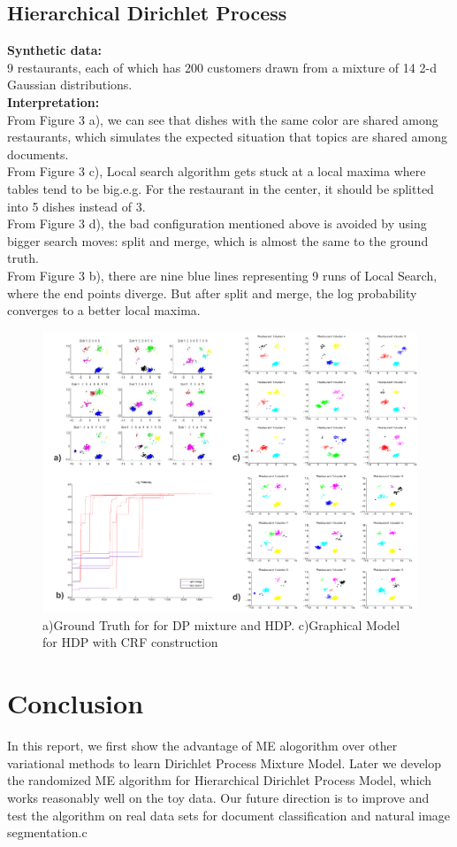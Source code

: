 \documentclass{article}
\begin{document}
\subsection{Hierarchical Dirichlet Process}
{\bf Synthetic data:}\\
 9 restaurants, each of which has 200 customers drawn from a mixture of 14 2-d Gaussian distributions.\\
{\bf Interpretation:}\\
From Figure 3 a), we can see that dishes with the same color are shared among restaurants, which simulates the expected situation that topics are shared among documents.\\
From Figure 3 c), Local search algorithm gets stuck at a local maxima where tables tend to be big.e.g. For the restaurant in the center, it should be 
splitted into 5 dishes instead of 3.\\
From Figure 3 d), the bad configuration mentioned above is avoided by using bigger search moves: split and merge, which is almost the same to the ground truth.\\
From Figure 3 b), there are nine blue lines representing 9 runs of Local Search, where the end points diverge. But after split and merge, 
the log probability converges to a better local maxima. 
\begin{figure}[h] 
    \centering 
    \includegraphics[width=1.0\textwidth]{me_hdp.pdf} 
    \caption{a)Ground Truth for  for DP mixture and HDP.  c)Graphical Model for HDP with CRF construction} 
    \label{fig:by:table} 
\end{figure}
\section{Conclusion}
In this report, we first show the advantage of ME alogorithm over other variational methods to learn Dirichlet Process Mixture Model. Later we 
develop the randomized ME algorithm for Hierarchical Dirichlet Process Model, which works reasonably well on the toy data. Our future 
direction is to improve and test the algorithm on real data sets for document classification and natural image segmentation.c
\end{document}
